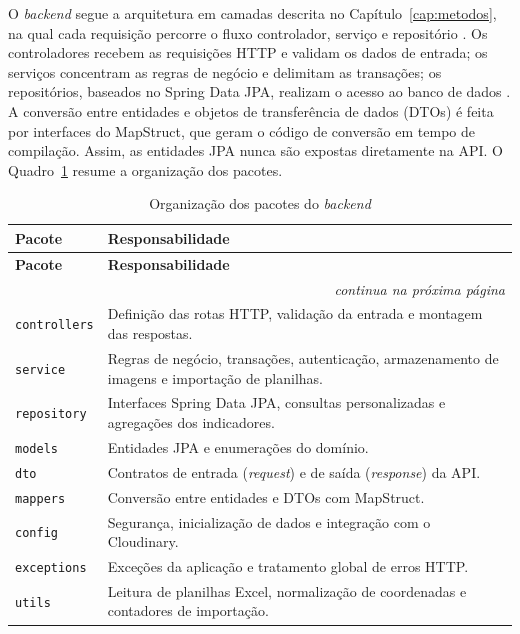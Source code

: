 O \textit{backend} segue a arquitetura em camadas descrita no Capítulo~\ref{cap:metodos}, na qual cada requisição percorre o fluxo controlador, serviço e repositório \cite{pressman2016}. Os controladores recebem as requisições HTTP e validam os dados de entrada; os serviços concentram as regras de negócio e delimitam as transações; os repositórios, baseados no Spring Data JPA, realizam o acesso ao banco de dados \cite{walls2019}. A conversão entre entidades e objetos de transferência de dados (DTOs) é feita por interfaces do MapStruct, que geram o código de conversão em tempo de compilação. Assim, as entidades JPA nunca são expostas diretamente na API. O Quadro~\ref{qua:pacotes} resume a organização dos pacotes.

\begin{longtable}{p{3.5cm}p{10cm}}
\caption{Organização dos pacotes do \textit{backend}}
\label{qua:pacotes} \\
\toprule
\textbf{Pacote} & \textbf{Responsabilidade} \\
\midrule
\endfirsthead
\toprule
\textbf{Pacote} & \textbf{Responsabilidade} \\
\midrule
\endhead
\midrule
\multicolumn{2}{r}{\small\textit{continua na próxima página}} \\
\endfoot
\bottomrule
\endlastfoot
\texttt{controllers}  & Definição das rotas HTTP, validação da entrada e montagem das respostas. \\[3pt]
\texttt{service}      & Regras de negócio, transações, autenticação, armazenamento de imagens e importação de planilhas. \\[3pt]
\texttt{repository}   & Interfaces Spring Data JPA, consultas personalizadas e agregações dos indicadores. \\[3pt]
\texttt{models}       & Entidades JPA e enumerações do domínio. \\[3pt]
\texttt{dto}          & Contratos de entrada (\textit{request}) e de saída (\textit{response}) da API. \\[3pt]
\texttt{mappers}      & Conversão entre entidades e DTOs com MapStruct. \\[3pt]
\texttt{config}       & Segurança, inicialização de dados e integração com o Cloudinary. \\[3pt]
\texttt{exceptions}   & Exceções da aplicação e tratamento global de erros HTTP. \\[3pt]
\texttt{utils}        & Leitura de planilhas Excel, normalização de coordenadas e contadores de importação. \\
\end{longtable}

